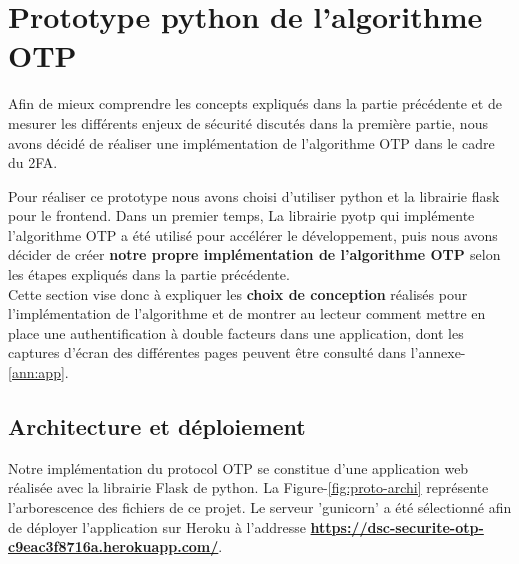 \documentclass[a4paper, 10pt]{article}
\newcommand{\otp}{\textsc{OTP} }
\begin{document}
\newpage
    \section{Prototype python de l'algorithme \otp}

    Afin de \textcolor{myblue}{mieux comprendre les concepts} expliqués dans la partie précédente et de mesurer les différents enjeux de sécurité discutés dans la première partie, nous avons décidé de réaliser une \textcolor{myblue}{implémentation de l'algorithme \otp dans le cadre du 2FA}.

    Pour réaliser ce prototype nous avons choisi d'utiliser \textcolor{mygreen}{python} et la \textcolor{mygreen}{librairie flask} pour le frontend. Dans un premier temps, La librairie \textcolor{mygreen}{pyotp} qui implémente l'algorithme \otp a été utilisé pour accélérer le développement, puis nous avons décider de créer \textbf{\textcolor{mygreen}{notre propre implémentation de l'algorithme \otp}} selon les étapes expliqués dans la partie précédente.\\

    Cette section vise donc à expliquer les \textbf{choix de conception} réalisés pour l'implémentation de l'algorithme et de montrer au lecteur comment \textcolor{myblue}{mettre en place une authentification à double facteurs} dans une application, dont les captures d'écran des différentes pages peuvent être consulté dans l'annexe-\ref{ann:app}.



    \subsection{Architecture et déploiement}

    Notre implémentation du protocol \otp se constitue d'une \textcolor{mygreen}{application web} réalisée avec la librairie Flask de python. La Figure-\ref{fig:proto-archi} représente l'arborescence des fichiers de ce projet. Le serveur '\textcolor{mygreen}{gunicorn}' a été sélectionné afin de déployer l'application sur Heroku à l'addresse \textbf{\url{https://dsc-securite-otp-c9eac3f8716a.herokuapp.com/}}.\\
\end{document}
